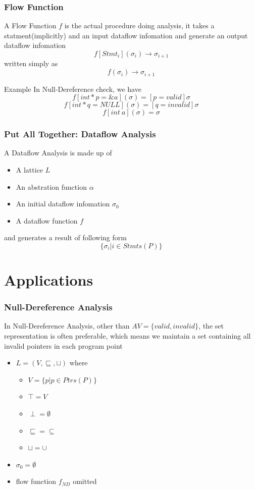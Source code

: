 \documentclass[]{beamer}
\begin{document}
\begin{frame}
  \frametitle{Flow Function}
  A \alert{Flow Function} $f$ is the actual procedure doing analysis, it takes a statment(implicitly)
  and an input dataflow infomation and generate an output dataflow infomation
  $$f[Stmt_i](\sigma_i) \rightarrow \sigma_{i+1}$$
  written simply as
  $$f(\sigma_i) \rightarrow \sigma_{i+1}$$

  \pause
  \begin{block}{Example}
    In Null-Dereference check, we have
    $$f[int *p=\&a](\sigma)=[p=valid]\sigma$$
    $$f[int *q=NULL](\sigma)=[q=invalid]\sigma$$
    $$f[int\ a](\sigma)=\sigma$$
  \end{block}
\end{frame}

\begin{frame}
  \frametitle{Put All Together: Dataflow Analysis}
  A Dataflow Analysis is made up of
  \begin{itemize}
    \item A lattice $L$
    \item An abstration function $\alpha$
    \item An initial dataflow infomation $\sigma_0$
    \item A dataflow function $f$
  \end{itemize}

  \pause
  and generates a result of following form
  $$\{\sigma_i | i \in Stmts(P)\}$$
\end{frame}

\section{Applications}
\frame{\tableofcontents[currentsection]}

\begin{frame}
  \frametitle{Null-Dereference Analysis}
  In Null-Dereference Analysis, other than $AV=\{valid, invalid\}$,
  the set representation is often preferable, which means we maintain
  a set containing all invalid pointers in each program point
  \begin{itemize}
    \item $L=(V, \sqsubseteq, \sqcup)$ where
      \begin{itemize}
      \item $V=\{p | p \in Ptrs(P)\}$
      \item $\top = V$
      \item $\perp = \emptyset$
      \item $\sqsubseteq = \subseteq$
      \item $\sqcup = \cup$
      \end{itemize}
    \item $\sigma_0 = \emptyset$
    \item flow function $f_{ND}$ omitted
  \end{itemize}
\end{frame}
\end{document}
